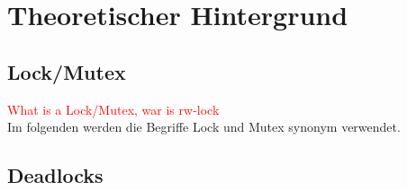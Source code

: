 \chapter{Theoretischer Hintergrund}

\section{Lock/Mutex}
\textcolor{red}{What is a Lock/Mutex, war is rw-lock}\\
Im folgenden werden die Begriffe Lock und Mutex synonym verwendet. 

\section{Deadlocks} \label{Kap::Theo:Deadlocks}


